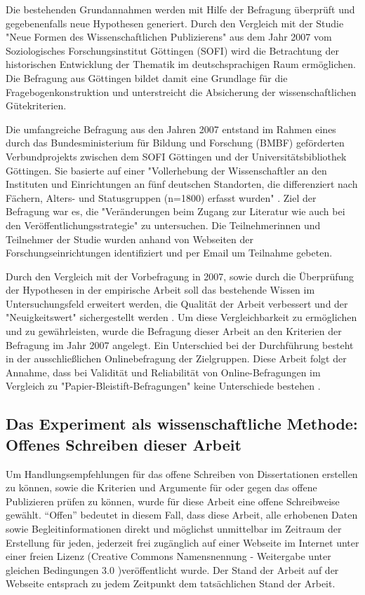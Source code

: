 Die bestehenden Grundannahmen werden mit Hilfe der Befragung überprüft und gegebenenfalls neue Hypothesen generiert. Durch den Vergleich mit der Studie "Neue Formen des Wissenschaftlichen Publizierens" aus dem Jahr 2007 vom Soziologisches Forschungsinstitut Göttingen (SOFI) wird die Betrachtung der historischen Entwicklung der Thematik im deutschsprachigen Raum ermöglichen. Die Befragung aus Göttingen bildet damit eine Grundlage für die Fragebogenkonstruktion und unterstreicht die Absicherung der wissenschaftlichen Gütekriterien.

Die umfangreiche Befragung aus den Jahren 2007 entstand im Rahmen eines durch das Bundesministerium für Bildung und Forschung (BMBF) geförderten Verbundprojekts zwischen dem SOFI Göttingen und der Universitätsbibliothek Göttingen. Sie basierte auf einer "Vollerhebung der Wissenschaftler an den Instituten und Einrichtungen an fünf deutschen Standorten, die differenziert nach Fächern, Alters- und Statusgruppen (n=1800) erfasst wurden" \cite{Hanekop_2014}. Ziel der Befragung war es, die "Veränderungen beim Zugang zur Literatur wie auch bei den Veröffentlichungsstrategie" \cite{Hanekop_Wittke_2007_Fragebogen} zu untersuchen. Die Teilnehmerinnen und Teilnehmer der Studie wurden anhand von Webseiten der Forschungseinrichtungen identifiziert und per Email um Teilnahme gebeten.

Durch den Vergleich mit der Vorbefragung in 2007, sowie durch die Überprüfung der Hypothesen in der empirische Arbeit soll das bestehende Wissen im Untersuchungsfeld erweitert werden, die Qualität der Arbeit verbessert und der "Neuigkeitswert" sichergestellt werden \cite{raab_2012_fragebogen}. Um diese Vergleichbarkeit zu ermöglichen und zu gewährleisten, wurde die Befragung dieser Arbeit an den Kriterien der Befragung im Jahr 2007 angelegt. Ein Unterschied bei der Durchführung besteht in der ausschließlichen Onlinebefragung der Zielgruppen. Diese Arbeit folgt der Annahme, dass bei Validität und Reliabilität von Online-Befragungen im Vergleich zu "Papier-Bleistift-Befragungen" keine Unterschiede bestehen \cite{Batinic_2013_onlinebefrag}.

\subsection{Das Experiment als wissenschaftliche Methode: Offenes Schreiben dieser Arbeit}

Um Handlungsempfehlungen für das offene Schreiben von Dissertationen erstellen zu können, sowie die Kriterien und Argumente für oder gegen das offene Publizieren prüfen zu können, wurde für diese Arbeit eine offene Schreibweise gewählt. “Offen” bedeutet in diesem Fall, dass diese Arbeit, alle erhobenen Daten sowie Begleitinformationen direkt und möglichst unmittelbar im Zeitraum der Erstellung für jeden, jederzeit frei zugänglich auf einer Webseite im Internet unter einer freien Lizenz (Creative Commons Namensnennung - Weitergabe unter gleichen Bedingungen 3.0 \cite{cc_by_sa_2008})veröffentlicht wurde. Der Stand der Arbeit auf der Webseite entsprach zu jedem Zeitpunkt dem tatsächlichen Stand der Arbeit.

